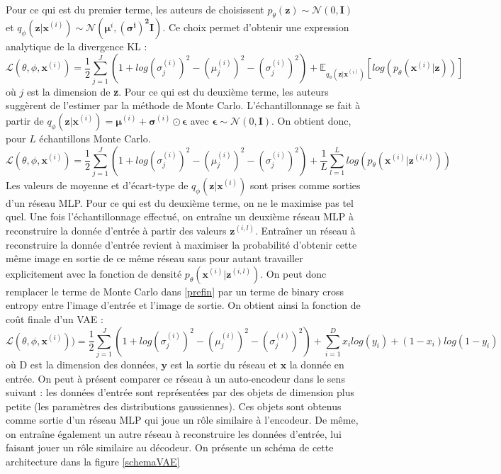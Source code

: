 \documentclass{article}
\begin{document}
 Pour ce qui est du premier terme, les auteurs de \cite{VAE} choisissent $p_{\theta}(\textbf{z})\sim \mathcal{N}(0,\textbf{I})$ et $q_{\phi}(\textbf{z}|\textbf{x}^{(i)})\sim \mathcal{N}(\boldsymbol{\mu}^{i},\boldsymbol{(\sigma^{i})^{2}}\textbf{I})$. Ce choix permet d'obtenir une expression analytique de la divergence KL : 
$$  \mathcal{L}(\theta,\phi,\textbf{x}^{(i)})=\frac{1}{2}\sum_{j=1}^{J}(1+log(\sigma^{(i)}_{j})^{2}-(\mu_{j}^{(i)})^{2}-(\sigma_{j}^{(i)})^{2})+\mathbb{E}_{q_{\phi}(\textbf{z}|\textbf{x}^{(i)})}[log(p_{\theta}(\textbf{x}^{(i)}|\textbf{z}))] $$
\noindent où $j$ est la dimension de \textbf{z}. Pour ce qui est du deuxième terme, les auteurs suggèrent de l'estimer par la méthode de Monte Carlo. L'échantillonnage se fait à partir de $q_{\phi}(\textbf{z}|\textbf{x}^{(i)})=\boldsymbol{\mu}^{(i)}+\boldsymbol{\sigma}^{(i)}\odot\boldsymbol{\epsilon}$ avec $\boldsymbol{\epsilon}\sim\mathcal{N}(0,\boldsymbol{I})$. On obtient donc, pour $L$ échantillons Monte Carlo.
\begin{equation}
   \mathcal{L}(\theta,\phi,\textbf{x}^{(i)})=\frac{1}{2}\sum_{j=1}^{J}(1+log(\sigma^{(i)}_{j})^{2}-(\mu_{j}^{(i)})^{2}-(\sigma_{j}^{(i)})^{2})+
    \frac{1}{L}\sum_{l=1}^{L}log(p_{\theta}(\boldsymbol{x}^{(i)}|\boldsymbol{z}^{(i,l)}))
    \label{prefin}
\end{equation}
Les valeurs de moyenne et d'écart-type de $q_{\phi}(\textbf{z}|\textbf{x}^{(i)})$ sont prises comme sorties d'un réseau MLP. Pour ce qui est du deuxième terme, on ne le maximise pas tel quel. Une fois l'échantillonnage effectué, on entraîne un deuxième réseau MLP à reconstruire la donnée d'entrée à partir des valeurs $\boldsymbol{z}^{(i,l)}$. Entraîner un réseau à reconstruire la donnée d'entrée revient à maximiser la probabilité d'obtenir cette même image en sortie de ce même réseau sans pour autant travailler explicitement avec la fonction de densité $p_{\theta}(\boldsymbol{x}^{(i)}|\boldsymbol{z}^{(i,l)})$. On peut donc remplacer le terme de Monte Carlo dans \ref{prefin} par un terme de binary cross entropy entre l'image d'entrée et l'image de sortie. On obtient ainsi la fonction de coût finale d'un VAE : 
\begin{equation}
   \mathcal{L}(\theta,\phi,\textbf{x}^{(i)}))=\frac{1}{2}\sum_{j=1}^{J}(1+log(\sigma^{(i)}_{j})^{2}-(\mu_{j}^{(i)})^{2}-(\sigma_{j}^{(i)})^{2})+
    \sum_{i=1}^{D}x_{i}log(y_{i})+(1-x_{i})log(1-y_{i})
    \label{lossVAE}
\end{equation}
\noindent où D est la dimension des données, $\boldsymbol{y}$ est la sortie du réseau et $\boldsymbol{x}$ la donnée en entrée. On peut à présent comparer ce réseau à un auto-encodeur dans le sens suivant : les données d'entrée sont représentées par des objets de dimension plus petite (les paramètres des distributions gaussiennes). Ces objets sont obtenus comme sortie d'un réseau MLP qui joue un rôle similaire à l'encodeur. De même, on entraîne également un autre réseau à reconstruire les données d'entrée, lui faisant jouer un rôle similaire au décodeur. On présente un schéma de cette architecture dans la figure \ref{schemaVAE}
\end{document}
